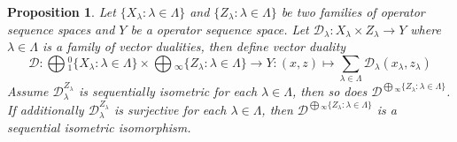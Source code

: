 \documentclass[12pt]{article}
\newtheorem{proposition}[theorem]{Proposition}
\begin{document}
\begin{proposition}\label{PrVectDualCoProdComp} Let 
$ \{X_\lambda:\lambda\in\Lambda \}$ and $ \{Z_\lambda:\lambda\in\Lambda \}$ 
be two families of operator sequence spaces and $Y$ be a 
operator sequence space. Let 
$\mathcal{D}_\lambda: X_\lambda\times Z_\lambda\to Y$ where 
$\lambda\in\Lambda$ is a family of vector dualities, then define vector duality
$$
\mathcal{D}
:\bigoplus{}_1^0 \{X_\lambda:\lambda\in\Lambda \}
    \times
\bigoplus{}_\infty \{Z_\lambda:\lambda\in\Lambda \}
    \to
Y
:(x,z)
    \mapsto
\sum\limits_{\lambda\in\Lambda}\mathcal{D}_\lambda(x_\lambda,z_\lambda)
$$
Assume $\mathcal{D}_\lambda^{Z_\lambda}$ is sequentially isometric for each 
$\lambda\in\Lambda$, then so does 
$\mathcal{D}^{\bigoplus{}_\infty \{Z_\lambda:\lambda\in\Lambda \}}$. If 
additionally $\mathcal{D}_\lambda^{Z_\lambda}$ is surjective for each 
$\lambda\in\Lambda$, then 
$\mathcal{D}^{\bigoplus{}_\infty \{Z_\lambda:\lambda\in\Lambda \}}$ is a 
sequential isometric isomorphism.
\end{proposition}
\end{document}
